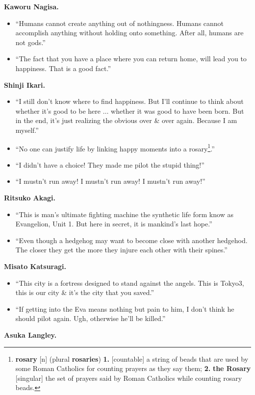\documentclass{article}
\begin{document}
\begin{enumerate}
    {\bf Kaworu Nagisa.}
	\begin{itemize}
   		\item ``Humans cannot create anything out of nothingness. Humans cannot accomplish anything without holding onto something. After all, humans are not gods.''
   		\item ``The fact that you have a place where you can return home, will lead you to happiness. That is a good fact.''
   	\end{itemize}
    {\bf Shinji Ikari.}
    \begin{itemize}
    	\item ``I still don't know where to find happiness. But I'll continue to think about whether it's good to be here $\ldots$ whether it was good to have been born. But in the end, it's just realizing the obvious over \& over again. Because I am myself.''
    	\item ``No one can justify life by linking happy moments into a rosary\footnote{{\bf rosary} [n] (plural {\bf rosaries}) {\bf 1.} [countable] a string of beads that are used by some Roman Catholics for counting prayers as they say them; {\bf 2.} {\bf the Rosary} [singular] the set of prayers said by Roman Catholics while counting rosary beads.}.''
    	\item ``I didn't have a choice! They made me pilot the stupid thing!''
    	\item ``I mustn't run away! I mustn't run away! I mustn't run away!''
    \end{itemize}
	{\bf Ritsuko Akagi.}
	\begin{itemize}
		\item ``This is man's ultimate fighting machine the synthetic life form know as Evangelion, Unit 1. But here in secret, it is mankind's last hope.''
		\item ``Even though a hedgehog may want to become close with another hedgehod. The closer they get the more they injure each other with their spines.''
	\end{itemize}
	{\bf Misato Katsuragi.}
	\begin{itemize}
		\item ``This city is a fortress designed to stand against the angels. This is Tokyo3, this is our city \& it's the city that you saved.''
		\item ``If getting into the Eva means nothing but pain to him, I don't think he should pilot again. Ugh, otherwise he'll be killed.''
	\end{itemize}
	{\bf Asuka Langley.}

\end{enumerate}
\end{document}
